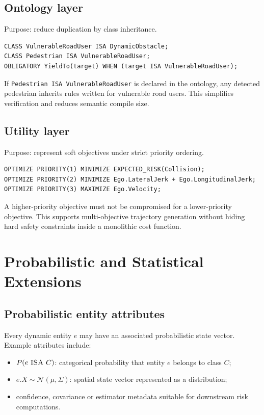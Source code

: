 \documentclass[11pt,a4paper]{article}
\begin{document}
\subsection{Ontology layer}
Purpose: reduce duplication by class inheritance.
\begin{verbatim}
CLASS VulnerableRoadUser ISA DynamicObstacle;
CLASS Pedestrian ISA VulnerableRoadUser;
OBLIGATORY YieldTo(target) WHEN (target ISA VulnerableRoadUser);
\end{verbatim}
If \texttt{Pedestrian ISA VulnerableRoadUser} is declared in the ontology, any detected pedestrian inherits rules written for vulnerable road users. This simplifies verification and reduces semantic compile size.

\subsection{Utility layer}
Purpose: represent soft objectives under strict priority ordering.
\begin{verbatim}
OPTIMIZE PRIORITY(1) MINIMIZE EXPECTED_RISK(Collision);
OPTIMIZE PRIORITY(2) MINIMIZE Ego.LateralJerk + Ego.LongitudinalJerk;
OPTIMIZE PRIORITY(3) MAXIMIZE Ego.Velocity;
\end{verbatim}
A higher-priority objective must not be compromised for a lower-priority objective. This supports multi-objective trajectory generation without hiding hard safety constraints inside a monolithic cost function.

\section{Probabilistic and Statistical Extensions}
\subsection{Probabilistic entity attributes}
Every dynamic entity $e$ may have an associated probabilistic state vector. Example attributes include:
\begin{itemize}
  \item $P(e\ \textsc{ISA}\ C)$: categorical probability that entity $e$ belongs to class $C$;
  \item $e.X \sim \mathcal{N}(\mu,\Sigma)$: spatial state vector represented as a distribution;
  \item confidence, covariance or estimator metadata suitable for downstream risk computations.
\end{itemize}
\end{document}
